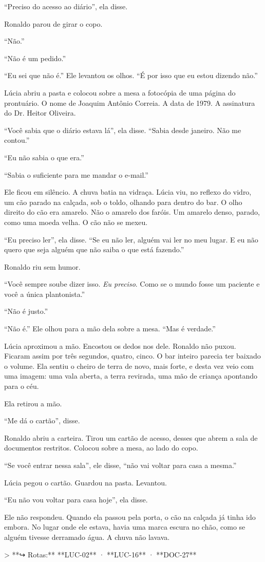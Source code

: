 \noindent ``Preciso do acesso ao diário'', ela disse.

\noindent Ronaldo parou de girar o copo.

\noindent ``Não.''

\noindent ``Não é um pedido.''

\noindent ``Eu sei que não é.'' Ele levantou os olhos. ``É por isso que eu estou dizendo não.''

\noindent Lúcia abriu a pasta e colocou sobre a mesa a fotocópia de uma página do prontuário. O nome de Joaquim Antônio Correia. A data de 1979. A assinatura do Dr. Heitor Oliveira.

\noindent ``Você sabia que o diário estava lá'', ela disse. ``Sabia desde janeiro. Não me contou.''

\noindent ``Eu não sabia o que era.''

\noindent ``Sabia o suficiente para me mandar o e-mail.''

\noindent Ele ficou em silêncio. A chuva batia na vidraça. Lúcia viu, no reflexo do vidro, um cão parado na calçada, sob o toldo, olhando para dentro do bar. O olho direito do cão era amarelo. Não o amarelo dos faróis. Um amarelo denso, parado, como uma moeda velha. O cão não se mexeu.

\noindent ``Eu preciso ler'', ela disse. ``Se eu não ler, alguém vai ler no meu lugar. E eu não quero que seja alguém que não saiba o que está fazendo.''

\noindent Ronaldo riu sem humor.

\noindent ``Você sempre soube dizer isso. \textit{Eu preciso}. Como se o mundo fosse um paciente e você a única plantonista.''

\noindent ``Não é justo.''

\noindent ``Não é.'' Ele olhou para a mão dela sobre a mesa. ``Mas é verdade.''

\noindent Lúcia aproximou a mão. Encostou os dedos nos dele. Ronaldo não puxou. Ficaram assim por três segundos, quatro, cinco. O bar inteiro parecia ter baixado o volume. Ela sentiu o cheiro de terra de novo, mais forte, e desta vez veio com uma imagem: uma vala aberta, a terra revirada, uma mão de criança apontando para o céu.

\noindent Ela retirou a mão.

\noindent ``Me dá o cartão'', disse.

\noindent Ronaldo abriu a carteira. Tirou um cartão de acesso, desses que abrem a sala de documentos restritos. Colocou sobre a mesa, ao lado do copo.

\noindent ``Se você entrar nessa sala'', ele disse, ``não vai voltar para casa a mesma.''

\noindent Lúcia pegou o cartão. Guardou na pasta. Levantou.

\noindent ``Eu não vou voltar para casa hoje'', ela disse.

\noindent Ele não respondeu. Quando ela passou pela porta, o cão na calçada já tinha ido embora. No lugar onde ele estava, havia uma marca escura no chão, como se alguém tivesse derramado água. A chuva não lavava.

> **↪ Rotas:** **LUC-02** · **LUC-16** · **DOC-27**
